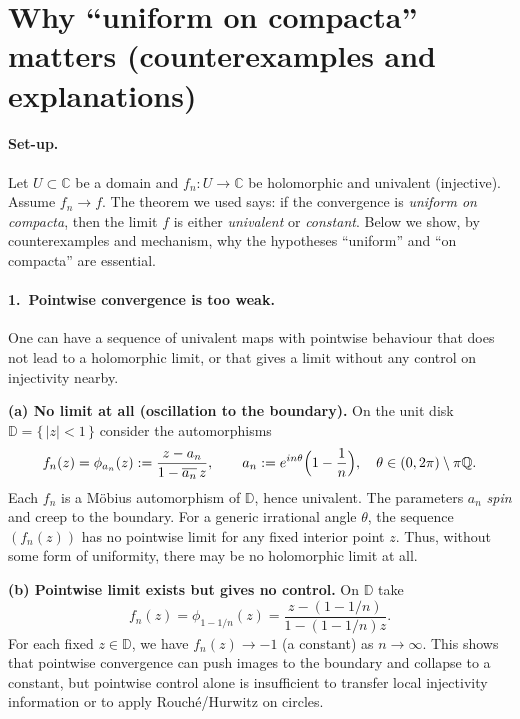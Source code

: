 \documentclass[12pt,a4paper]{article}
\begin{document}
\section*{Why ``uniform on compacta'' matters (counterexamples and explanations)}

\paragraph{Set-up.}
Let $U\subset\mathbb{C}$ be a domain and $f_n:U\to\mathbb{C}$ be holomorphic and univalent (injective).
Assume $f_n \to f$.
The theorem we used says: if the convergence is \emph{uniform on compacta}, then the limit $f$ is either
\emph{univalent} or \emph{constant}.
Below we show, by counterexamples and mechanism, why the hypotheses
``uniform'' and ``on compacta'' are essential.

\bigskip

\paragraph{1.\ Pointwise convergence is too weak.}
One can have a sequence of univalent maps with pointwise behaviour that does not lead to a holomorphic limit,
or that gives a limit without any control on injectivity nearby.

\medskip

\textbf{(a) No limit at all (oscillation to the boundary).}
On the unit disk $\mathbb{D}=\{\,|z|<1\,\}$ consider the automorphisms
\[
f_n(z)=\phi_{a_n}(z):=\frac{z-a_n}{1-\overline{a_n}\,z},\qquad
a_n:=e^{in\theta}\Bigl(1-\frac1n\Bigr),\quad \theta\in(0,2\pi)\setminus\pi\mathbb{Q}.
\]
Each $f_n$ is a Möbius automorphism of $\mathbb{D}$, hence univalent.
The parameters $a_n$ \emph{spin} and creep to the boundary.
For a generic irrational angle $\theta$, the sequence $(f_n(z))$ has no pointwise limit for any fixed interior point $z$.
Thus, without some form of uniformity, there may be no holomorphic limit at all.

\medskip

\textbf{(b) Pointwise limit exists but gives no control.}
On $\mathbb{D}$ take
\[
f_n(z)=\phi_{1-1/n}(z)=\frac{z-(1-1/n)}{1-(1-1/n)z}.
\]
For each fixed $z\in\mathbb{D}$, we have $f_n(z)\to -1$ (a constant) as $n\to\infty$.
This shows that pointwise convergence can push images to the boundary and collapse to a constant,
but pointwise control alone is insufficient to transfer local injectivity information or to apply Rouché/Hurwitz on circles.
\end{document}
